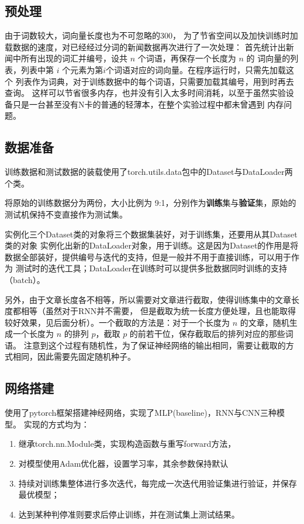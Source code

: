 \documentclass[a4paper]{article}
\begin{document}
    \subsection{预处理}
    由于词数较大，词向量长度也为不可忽略的300，
    为了节省空间以及加快训练时加载数据的速度，对已经经过分词的新闻数据再次进行了一次处理：
    首先统计出新闻中所有出现的词汇并编号，设共 $n$ 个词语，再保存一个长度为 $n$ 的
    词向量的列表，列表中第 $i$ 个元素为第$i$个词语对应的词向量。在程序运行时，只需先加载这个
    列表作为词典，对于训练数据中的每个词语，只需要加载其编号，用到时再去查询。
    这样可以节省很多内存，也并没有引入太多时间消耗，以至于虽然实验设备只是一台甚至没有N卡的普通的轻薄本，在整个实验过程中都未曾遇到
    内存问题。
    

    \subsection{数据准备}

    训练数据和测试数据的装载使用了torch.utils.data包中的Dataset与DataLoader两个类。

    将原始的训练数据分为两份，大小比例为 9:1，分别作为\textbf{训练}集与\textbf{验证}集，原始的测试机保持不变直接作为测试集。

    实例化三个Dataset类的对象将三个数据集装好，对于训练集，还要用从其Dataset类的对象
    实例化出新的DataLoader对象，用于训练。这是因为Dataset的作用是将数据全部装好，提供编号与迭代的支持，但是一般并不用于直接训练，可以用于作为
    测试时的迭代工具；DataLoader在训练时可以提供多批数据同时训练的支持（batch）。

    另外，由于文章长度各不相等，所以需要对文章进行截取，使得训练集中的文章长度都相等（虽然对于RNN并不需要，
    但是截取为统一长度方便处理，且也能取得较好效果，见后面分析）。一个截取的方法是：对于一个长度为
     $n$ 的文章，随机生成一个长度为 $n$ 的排列 $p$，截取 $p$ 的前若干位，保存截取后的排列对应的那些词语。
    注意到这个过程有随机性，为了保证神经网络的输出相同，需要让截取的方式相同，因此需要先固定随机种子。

    \subsection{网络搭建}
    使用了pytorch框架搭建神经网络，实现了MLP(baseline)，RNN与CNN三种模型。
    实现的方式均为：
    \begin{enumerate}
        \item 继承torch.nn.Module类，实现构造函数与重写forward方法，
        \item 对模型使用Adam优化器，设置学习率，其余参数保持默认
        \item 持续对训练集整体进行多次迭代，每完成一次迭代用验证集进行验证，并保存最优模型；
        \item 达到某种判停准则要求后停止训练，并在测试集上测试结果。
    \end{enumerate}
\end{document}
